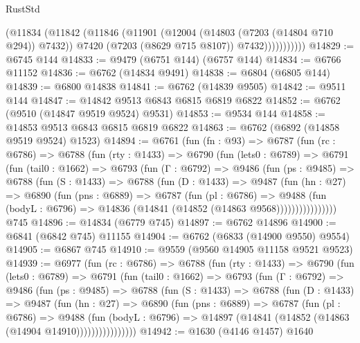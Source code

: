 \begin{lexlean}{RustStd}
\begin{coremodule}
                  (@11834
                    (@11842
                      (@11846
                        (@11901
                          (@12004 (@14803 (@7203 (@14804 @710 @294)) @7432))
                          @7420
                          (@7203 (@8629 @715 @8107))
                          @7432)))))))))))
@14829 := @6745 @144
@14833 := @9479 (@6751 @144) (@6757 @144)
@14834 := @6766 @11152
@14836 := @6762 (@14834 @9491)
@14838 := @6804 (@6805 @144)
@14839 := @6800 @14838
@14841 := @6762 (@14839 @9505)
@14842 := @9511 @144
@14847 := @14842 @9513 @6843 @6815 @6819 @6822
@14852 := @6762 (@9510 (@14847 @9519 @9524) @9531)
@14853 := @9534 @144
@14858 := @14853 @9513 @6843 @6815 @6819 @6822
@14863 := @6762 (@6892 (@14858 @9519 @9524) @1523)
@14894 := @6761
    (fun (fn : @93) =>
    @6787
      (fun (rc : @6786) =>
      @6788
        (fun (rty : @1433) =>
        @6790
          (fun (lets0 : @6789) =>
          @6791
            (fun (tail0 : @1662) =>
            @6793
              (fun (Γ : @6792) =>
              @9486
                (fun (ps : @9485) =>
                @6788
                  (fun (S : @1433) =>
                  @6788
                    (fun (D : @1433) =>
                    @9487
                      (fun (hn : @27) =>
                      @6890
                        (fun (pns : @6889) =>
                        @6787
                          (fun (pl : @6786) =>
                          @9488
                            (fun (bodyL : @6796) =>
                            @14836 (@14841 (@14852 (@14863 @9568))))))))))))))))
    @745
@14896 := @14834 (@6779 @745)
@14897 := @6762 @14896
@14900 := @6841 (@6842 @745) @11155
@14904 := @6762 (@6833 (@14900 @9550) @9554)
@14905 := @6867 @745
@14910 := @9559 (@9560 @14905 @11158 @9521 @9523)
@14939 := @6977
    (fun (rc : @6786) =>
    @6788
      (fun (rty : @1433) =>
      @6790
        (fun (lets0 : @6789) =>
        @6791
          (fun (tail0 : @1662) =>
          @6793
            (fun (Γ : @6792) =>
            @9486
              (fun (ps : @9485) =>
              @6788
                (fun (S : @1433) =>
                @6788
                  (fun (D : @1433) =>
                  @9487
                    (fun (hn : @27) =>
                    @6890
                      (fun (pns : @6889) =>
                      @6787
                        (fun (pl : @6786) =>
                        @9488
                          (fun (bodyL : @6796) =>
                          @14897 (@14841 (@14852 (@14863 (@14904 @14910))))))))))))))))
@14942 := @1630 (@4146 @1457) @1640

\end{coremodule}
\end{lexlean}
